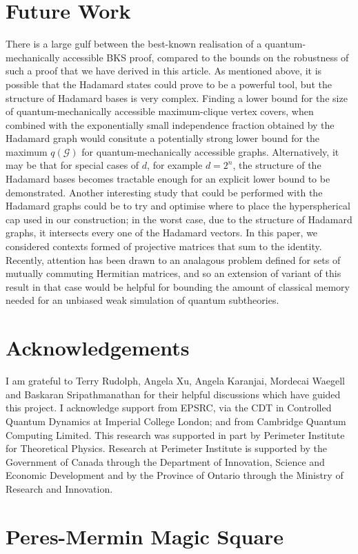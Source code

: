 \documentclass{amsart}
\theoremstyle{definition}
\begin{document}
\section{Future Work}
There is a large gulf between the best-known realisation of a quantum-mechanically accessible BKS proof, compared to the bounds on the robustness of such a proof that we have derived in this article. As mentioned above, it is possible that the Hadamard states could prove to be a powerful tool, but the structure of Hadamard bases is very complex. Finding a lower bound for the size of quantum-mechanically accessible maximum-clique vertex covers, when combined with the exponentially small independence fraction obtained by the Hadamard graph would consitute a potentially strong lower bound for the maximum $q(\mathcal{G})$ for quantum-mechanically accessible graphs. Alternatively, it may be that for special cases of $d$, for example $d=2^n$, the structure of the Hadamard bases becomes tractable enough for an explicit lower bound to be demonstrated. Another interesting study that could be performed with the Hadamard graphs could be to try and optimise where to place the hyperspherical cap used in our construction; in the worst case, due to the structure of Hadamard graphs, it intersects every one of the Hadamard vectors. In this paper, we considered contexts formed of projective matrices that sum to the identity. Recently, attention has been drawn to an analagous problem defined for sets of mutually commuting Hermitian matrices, and so an extension of variant of this result in that case would be helpful for bounding the amount of classical memory needed for an unbiased weak simulation of quantum subtheories.\cite{Kara2017} %

\section{Acknowledgements}
I am grateful to Terry Rudolph, Angela Xu, Angela Karanjai, Mordecai Waegell and Baskaran Sripathmanathan for their helpful discussions which have guided this project. I acknowledge support from EPSRC, via the CDT in Controlled Quantum Dynamics at Imperial College London; and from Cambridge Quantum Computing Limited. This research was supported in part by Perimeter Institute for Theoretical Physics. Research at Perimeter Institute is supported by the Government of Canada through the Department of Innovation, Science and Economic Development and by the Province of Ontario through the Ministry of Research and Innovation.

{}

\appendix
\section{Peres-Mermin Magic Square}
\end{document}
